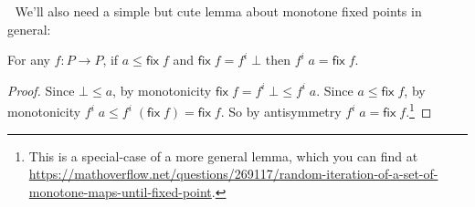 \documentclass[a5,libertine]{rntz}
\newcommand{\ms}[1]{\ensuremath{\mathsf{#1}}}
\newcommand{\fix}{\ms{fix}}
\newcommand{\dv}{\delta}
\begin{document}





We'll also need a simple but cute lemma about monotone fixed points in general:

\begin{lemma} \label{lem:jcreed}
  For any $f : P \to P$, if $a \le \fix\;f$ and $\fix\;f = f^i\;\bot$ then
  $f^i\;a = \fix\;f$.
\end{lemma}
\begin{proof}
  Since $\bot \le a$, by monotonicity $\fix\;f = f^i\;\bot \le f^i\;a$. Since $a
  \le \fix\;f$, by monotonicity $f^i\;a \le f^i\;(\fix\;f) = \fix\;f$. So by
  antisymmetry $f^i\;a = \fix\;f$.\footnote{This is a special-case of a more general lemma, which you can find at \url{https://mathoverflow.net/questions/269117/random-iteration-of-a-set-of-monotone-maps-until-fixed-point}.}
\end{proof}
\end{document}
